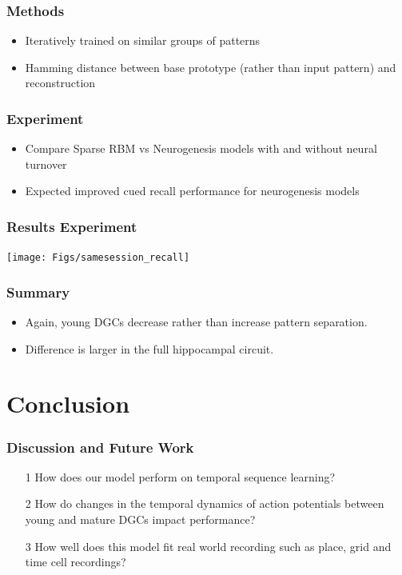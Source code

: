\documentclass{beamer}
\begin{document}
\begin{frame}
\frametitle{Methods}
\begin{itemize}
\item Iteratively trained on similar groups of patterns
\item Hamming distance between base prototype (rather than input pattern) and reconstruction
\end{itemize}
\end{frame}

\begin{frame}
\frametitle{Experiment}
\begin{itemize}
\item Compare Sparse RBM vs Neurogenesis models with and without neural turnover
\item Expected improved cued recall performance for neurogenesis models
\end{itemize}
\end{frame}

\begin{frame}
\frametitle{Results Experiment}
\center
\texttt{[image: Figs/samesession\_recall]}
\end{frame}

\begin{frame}
\frametitle{Summary}
\begin{itemize}
\item Again, young DGCs decrease rather than increase pattern separation.
\item Difference is larger in the full hippocampal circuit.
\end{itemize}
\end{frame}

\section{Conclusion}

\begin{frame}
\frametitle{Discussion and Future Work}
\begin{itemize}
\item[1] How does our model perform on temporal sequence learning?
\item[2] How do changes in the temporal dynamics of action potentials between young and mature \ac{DGC}s impact performance?
\item[3] How well does this model fit real world recording such as place, grid and time cell recordings?
\end{itemize}
\end{frame}
\end{document}
